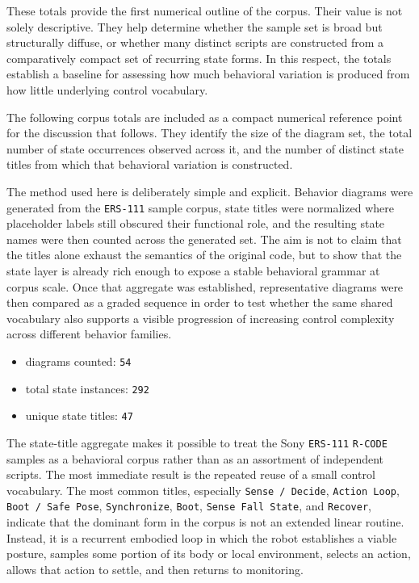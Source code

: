 \documentclass[11pt]{article}
\begin{document}
These totals provide the first numerical outline of the corpus. Their
value is not solely descriptive. They help determine whether the sample
set is broad but structurally diffuse, or whether many distinct scripts
are constructed from a comparatively compact set of recurring state
forms. In this respect, the totals establish a baseline for assessing
how much behavioral variation is produced from how little underlying
control vocabulary.

The following corpus totals are included as a compact numerical
reference point for the discussion that follows. They identify the size
of the diagram set, the total number of state occurrences observed
across it, and the number of distinct state titles from which that
behavioral variation is constructed.

The method used here is deliberately simple and explicit. Behavior
diagrams were generated from the \texttt{ERS-111} sample corpus, state
titles were normalized where placeholder labels still obscured their
functional role, and the resulting state names were then counted
across the generated set. The aim is not to claim that the titles
alone exhaust the semantics of the original code, but to show that the
state layer is already rich enough to expose a stable behavioral
grammar at corpus scale. Once that aggregate was established,
representative diagrams were then compared as a graded sequence in
order to test whether the same shared vocabulary also supports a
visible progression of increasing control complexity across different
behavior families.

\begin{itemize}
\item diagrams counted: \texttt{54}
\item total state instances: \texttt{292}
\item unique state titles: \texttt{47}
\end{itemize}

The state-title aggregate makes it possible to treat the Sony
\texttt{ERS-111} \texttt{R-CODE} samples as a behavioral corpus rather than
as an assortment of independent scripts. The most immediate result is
the repeated reuse of a small control vocabulary. The most common
titles, especially \texttt{Sense / Decide}, \texttt{Action Loop},
\texttt{Boot / Safe Pose}, \texttt{Synchronize}, \texttt{Boot},
\texttt{Sense Fall State}, and \texttt{Recover}, indicate that the
dominant form in the corpus is not an extended linear routine. Instead,
it is a recurrent embodied loop in which the robot establishes a viable
posture, samples some portion of its body or local environment,
selects an action, allows that action to settle, and then returns to
monitoring.
\end{document}
